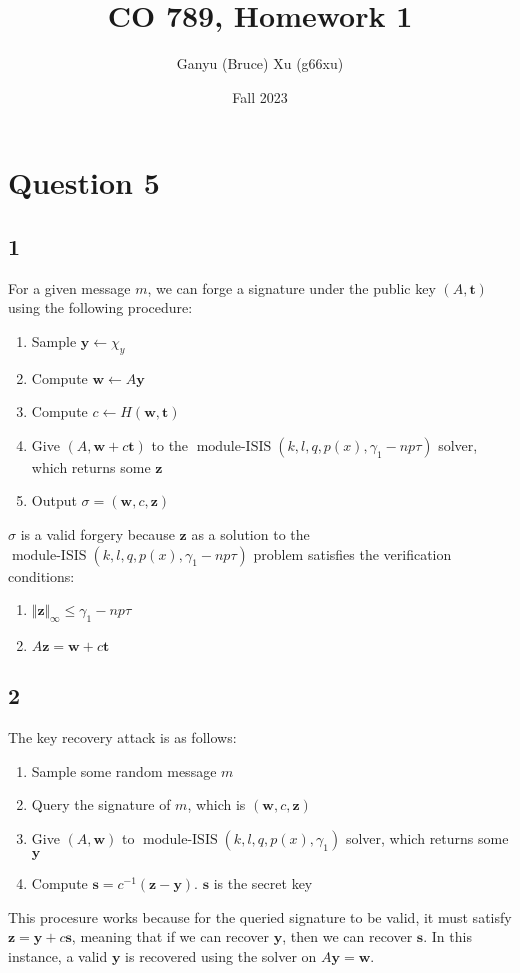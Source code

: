 \documentclass{article}
\title{CO 789, Homework 1}
\author{Ganyu (Bruce) Xu (g66xu)}
\date{Fall 2023}
\newcommand{\norm}[1]{\Vert {#1} \Vert}
\begin{document}

\section*{Question 5}

\subsection*{1}
For a given message $m$, we can forge a signature under the public key $(A, \mathbf{t})$ using the following procedure:

\begin{enumerate}
    \item Sample $\mathbf{y} \leftarrow \chi_y$ 
    \item Compute $\mathbf{w} \leftarrow A\mathbf{y}$
    \item Compute $c \leftarrow H(\mathbf{w}, \mathbf{t})$
    \item Give $(A, \mathbf{w} + c\mathbf{t})$ to the $\operatorname{module-ISIS}(k, l, q, p(x), \gamma_1 - np\tau)$ solver, which returns some $\mathbf{z}$
    \item Output $\sigma = (\mathbf{w}, c, \mathbf{z})$
\end{enumerate}

$\sigma$ is a valid forgery because $\mathbf{z}$ as a solution to the $\operatorname{module-ISIS}(k, l, q, p(x), \gamma_1 - np\tau)$ problem satisfies the verification conditions:

\begin{enumerate}
    \item $\norm{\mathbf{z}}_\infty \leq \gamma_1 - np\tau$
    \item $A\mathbf{z} = \mathbf{w} + c\mathbf{t}$
\end{enumerate}

\subsection*{2}
The key recovery attack is as follows:

\begin{enumerate}
    \item Sample some random message $m$
    \item Query the signature of $m$, which is $(\mathbf{w}, c, \mathbf{z})$
    \item Give $(A, \mathbf{w})$ to $\operatorname{module-ISIS}(k, l, q, p(x), \gamma_1)$ solver, which returns some $\mathbf{y}$
    \item Compute $\mathbf{s} = c^{-1}(\mathbf{z} - \mathbf{y})$. $\mathbf{s}$ is the secret key
\end{enumerate}

This procesure works because for the queried signature to be valid, it must satisfy $\mathbf{z} = \mathbf{y} + c\mathbf{s}$, meaning that if we can recover $\mathbf{y}$, then we can recover $\mathbf{s}$. In this instance, a valid $\mathbf{y}$ is recovered using the solver on $A\mathbf{y} = \mathbf{w}$.
\end{document}
